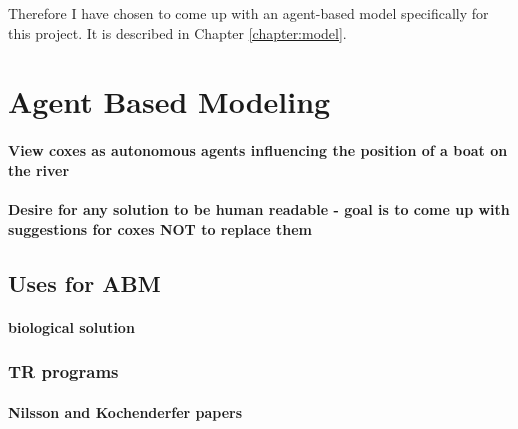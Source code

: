  Therefore I have chosen to come up with an agent-based model specifically for this project. It is described in Chapter \ref{chapter:model}.
  
  \section{Agent Based Modeling}
    \paragraph{View coxes as autonomous agents influencing the position of a boat on the river}
    \paragraph{Desire for any solution to be human readable - goal is to come up with suggestions for coxes NOT to replace them}
    \subsection{Uses for ABM}
      \paragraph{biological solution}
    
      
      \subsubsection{TR programs}
        \paragraph{Nilsson and Kochenderfer papers}
        
  